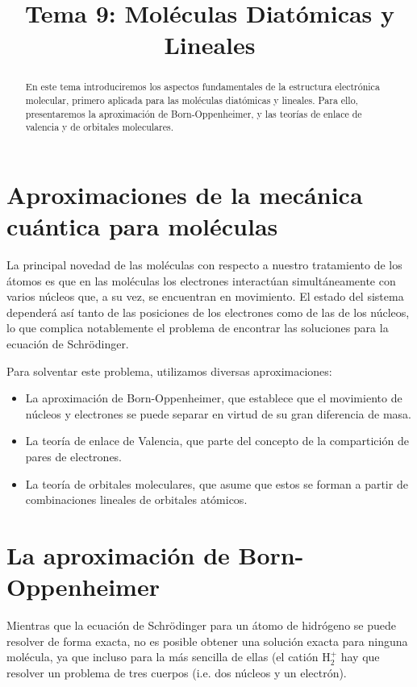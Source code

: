 \documentclass{tufte-handout}
\title[Química Física II: Tema 9 - Moléculas Diatómicas y Lineales]{
Tema 9: Moléculas Diatómicas y Lineales}
\date{}  %
\begin{document}
\maketitle%

\begin{abstract}
\noindent En este tema introduciremos los aspectos 
fundamentales de la estructura electrónica molecular, primero
aplicada para las moléculas diatómicas y lineales. Para ello, presentaremos la aproximación de Born-Oppenheimer, y las teorías de enlace de valencia y de orbitales moleculares.
\end{abstract}


\section{Aproximaciones de la mecánica cuántica para moléculas}
La principal novedad de las 
moléculas con respecto a nuestro tratamiento de los
átomos es que en las moléculas los electrones interactúan simultáneamente
con varios núcleos que, a su vez, se encuentran en
movimiento. El estado del sistema dependerá así tanto 
de las posiciones de los electrones como de las de los 
núcleos, lo que complica notablemente el problema de
encontrar las soluciones para la ecuación de Schrödinger. 

Para solventar este problema, utilizamos diversas 
aproximaciones:
\begin{itemize}
\item La aproximación de Born-Oppenheimer, que establece
que el movimiento de núcleos y electrones se puede
separar en virtud de su gran diferencia de masa.
\item La teoría de enlace de Valencia, que parte del 
concepto de la compartición de pares de electrones.
\item La teoría de orbitales moleculares, que asume que
estos se forman a partir de combinaciones lineales de 
orbitales atómicos. 
\end{itemize}

\section{La aproximación de Born-Oppenheimer}
Mientras que la ecuación de Schrödinger para un átomo 
de hidrógeno se puede resolver de forma exacta, no es 
posible obtener una solución exacta para ninguna molécula,
ya que incluso para la más sencilla de ellas (el catión
H$_2^+$ hay que resolver un problema de tres cuerpos 
(i.e. dos núcleos y un electrón). 
\end{document}
